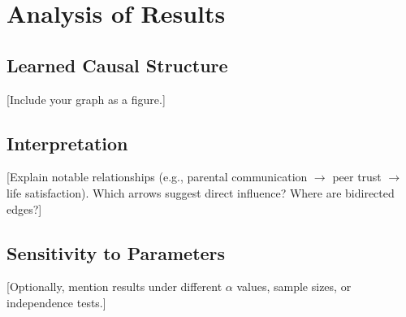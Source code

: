 \section{Analysis of Results}

\subsection{Learned Causal Structure}
[Include your graph as a figure.]


\subsection{Interpretation}
[Explain notable relationships (e.g., parental communication $\rightarrow$ peer trust $\rightarrow$ life satisfaction). Which arrows suggest direct influence? Where are bidirected edges?]

\subsection{Sensitivity to Parameters}
[Optionally, mention results under different $\alpha$ values, sample sizes, or independence tests.]
